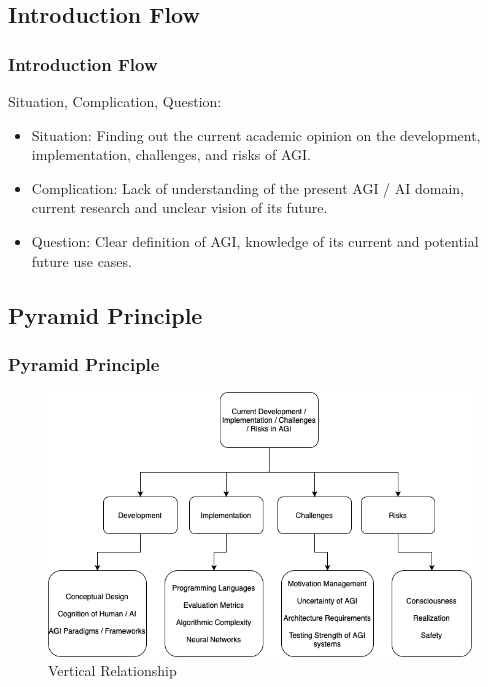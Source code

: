 \documentclass[
	11pt, %
]{beamer}
\begin{document}
\subsection{Introduction Flow}

\begin{frame}
	\frametitle{Introduction Flow}
    

    Situation, Complication, Question:
       
	\bigskip %

	\begin{itemize}
		\item Situation: Finding out the current academic opinion on the development, implementation, challenges, and risks of AGI.
  
        \bigskip %
        \item Complication: Lack of understanding of the present AGI / AI domain, current research and unclear vision of its future.
        
        \bigskip %
        \item Question: Clear definition of AGI, knowledge of its current and potential future use cases.

	\end{itemize}
    
\end{frame}



\subsection{Pyramid Principle}

\begin{frame}
	\frametitle{Pyramid Principle}
	
	\begin{figure}
		\includegraphics[width=0.8\linewidth]{Images/new_pyramid.png}
		\caption{Vertical Relationship}
	\end{figure}
\end{frame}
\end{document}
